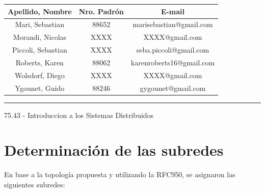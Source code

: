 \documentclass[12pt,titlepage]{article}
\begin{document}
\begin{titlepage}
\begin{center}
\large\addtolength{\tabcolsep}{-3pt}
\begin{tabular}{|| c | c | c ||}
  \hline
    \textbf{Apellido, Nombre} & \textbf{Nro. Padrón} & \textbf{E-mail} \\
  \hline
    Mari, Sebastian & 88652 & marisebastian@gmail.com \\
  \hline
    Morandi, Nicolas & XXXX & XXXX@gmail.com \\
  \hline
    Piccoli, Sebastian & XXXX & seba.piccoli@gmail.com \\
  \hline
    Roberts, Karen & 88062 & karenroberts16@gmail.com \\
  \hline
    Wolsdorf, Diego & XXXX & XXXX@gmail.com \\
  \hline
    Ygounet, Guido & 88246 & gygounet@gmail.com \\
  \hline
\end{tabular}
\end{center}

\vfill

\hrule
\vspace{0.2cm}

\noindent\small{75.43 - Introduccion a los Sistemas Distribuidos}

\end{titlepage}



\setcounter{page}{1}

\tableofcontents
\newpage



\section{Determinación de las subredes}

En base a la topolog\'ia propuesta y utilizando la RFC950, se asignaron las siguientes subredes:
\end{document}
